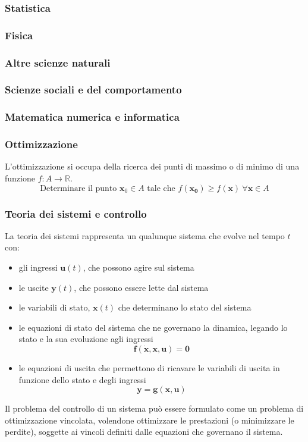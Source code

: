 \subsubsection{Statistica}
\subsubsection{Fisica}
\subsubsection{Altre scienze naturali}
\subsubsection{Scienze sociali e del comportamento}
\subsubsection{Matematica numerica e informatica}
\subsubsection{Ottimizzazione}
L'ottimizzazione si occupa della ricerca dei punti di massimo o di minimo di una funzione $f:A \rightarrow \mathbb{R}$.
\begin{equation}
    \text{Determinare il punto $\mathbf{x}_0 \in A$ tale che $f(\mathbf{x_0}) \ge f(\mathbf{x}) \ \forall \mathbf{x} \in A$}
\end{equation}
\subsubsection{Teoria dei sistemi e controllo}
La teoria dei sistemi rappresenta un qualunque sistema che evolve nel tempo $t$ con:
\begin{itemize}
    \item gli ingressi $\mathbf{u}(t)$, che possono agire sul sistema
    \item le uscite $\mathbf{y}(t)$, che possono essere lette dal sistema
    \item le variabili di stato, $\mathbf{x}(t)$ che determinano lo stato del sistema
    \item le equazioni di stato del sistema che ne governano la dinamica, legando lo stato e la sua evoluzione agli ingressi
        \begin{equation}
            \mathbf{f}(\dot{\mathbf{x}}, \mathbf{x}, \mathbf{u}) = \mathbf{0}
        \end{equation}
    \item le equazioni di uscita che permettono di ricavare le variabili di uscita in funzione dello stato e degli ingressi
        \begin{equation}
            \mathbf{y} = \mathbf{g}(\mathbf{x}, \mathbf{u})
        \end{equation}
\end{itemize}
Il problema del controllo di un sistema può essere formulato come un problema di ottimizzazione vincolata, volendone ottimizzare le prestazioni (o minimizzare le perdite), soggette ai vincoli definiti dalle equazioni che governano il sistema.
